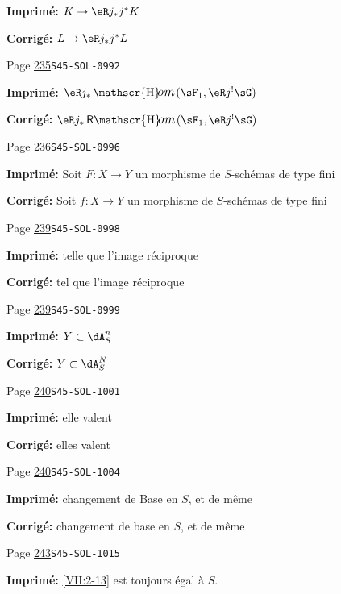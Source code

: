 \documentclass[oneside]{book}
\providecommand\calligra{\itshape}}
\DeclareMathOperator{\Hom}{\mathscr{H}\text{\kern -3pt {\calligra\large om}}\,} %
\DeclareMathOperator{\rHom}{\mathsf{R}\vspace{-1pt}\mathscr{H}\text{\kern -3pt {\calligra\large om}}\,}
\theoremstyle{sga-source}
\theoremstyle{sga-source-dash}
\theoremstyle{sga-source-dotdash}
\theoremstyle{sga-source-number-note-dash}
\theoremstyle{sga-source-note-number-dotdash}
\theoremstyle{sga-source-example-dotdash}
\theoremstyle{sga-source-inline-number}
\theoremstyle{sga-source-bare-number}
\theoremstyle{sga-source}
\begin{document}
\begin{description}
\par\noindent\textbf{Imprimé:} \(K\to \eR j_\ast j^\ast K\)
\par\noindent\textbf{Corrigé:} \(L\to \eR j_\ast j^\ast L\)
\smallskip
\item[\hypertarget{apparatus:FR-0249}{249}] Page \hyperlink{printpage:fr:235}{235}\quad\texttt{S45-SOL-0992}
\par\noindent\textbf{Imprimé:} \(\eR j_\ast \Hom(\sF_1,\eR j^! \sG)\)
\par\noindent\textbf{Corrigé:} \(\eR j_\ast \rHom(\sF_1,\eR j^! \sG)\)
\smallskip
\item[\hypertarget{apparatus:FR-0250}{250}] Page \hyperlink{printpage:fr:236}{236}\quad\texttt{S45-SOL-0996}
\par\noindent\textbf{Imprimé:} Soit $F:X\to Y$ un morphisme de $S$-schémas de type fini
\par\noindent\textbf{Corrigé:} Soit $f:X\to Y$ un morphisme de $S$-schémas de type fini
\smallskip
\item[\hypertarget{apparatus:FR-0251}{251}] Page \hyperlink{printpage:fr:239}{239}\quad\texttt{S45-SOL-0998}
\par\noindent\textbf{Imprimé:} telle 
    que l'image réciproque
\par\noindent\textbf{Corrigé:} tel 
    que l'image réciproque
\smallskip
\item[\hypertarget{apparatus:FR-0252}{252}] Page \hyperlink{printpage:fr:239}{239}\quad\texttt{S45-SOL-0999}
\par\noindent\textbf{Imprimé:} \(Y\subset \dA_S^n\)
\par\noindent\textbf{Corrigé:} \(Y\subset \dA_S^N\)
\smallskip
\item[\hypertarget{apparatus:FR-0253}{253}] Page \hyperlink{printpage:fr:240}{240}\quad\texttt{S45-SOL-1001}
\par\noindent\textbf{Imprimé:} elle valent
\par\noindent\textbf{Corrigé:} elles valent
\smallskip
\item[\hypertarget{apparatus:FR-0254}{254}] Page \hyperlink{printpage:fr:240}{240}\quad\texttt{S45-SOL-1004}
\par\noindent\textbf{Imprimé:} changement de Base en $S$, et de même
\par\noindent\textbf{Corrigé:} changement de base en $S$, et de même
\smallskip
\item[\hypertarget{apparatus:FR-0255}{255}] Page \hyperlink{printpage:fr:243}{243}\quad\texttt{S45-SOL-1015}
\par\noindent\textbf{Imprimé:} \ref{VII:2-13} est toujours égal à $S$.

\end{description}
\end{document}

